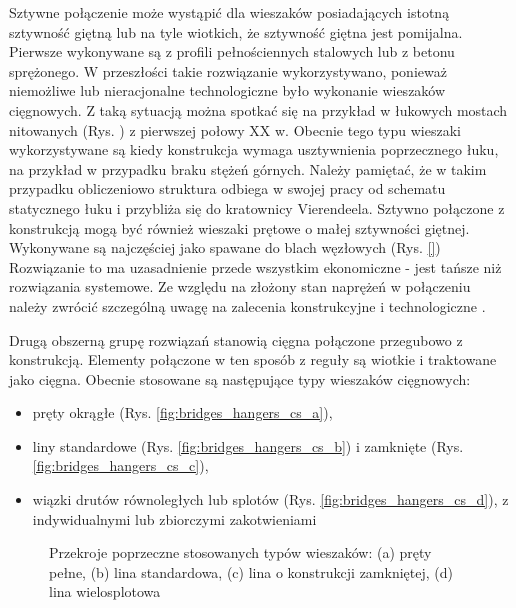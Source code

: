 Sztywne połączenie może wystąpić dla wieszaków posiadających istotną sztywność giętną lub na tyle wiotkich, że sztywność giętna jest pomijalna. Pierwsze wykonywane są z profili pełnościennych stalowych lub z betonu sprężonego. W przeszłości takie rozwiązanie wykorzystywano, ponieważ niemożliwe lub nieracjonalne technologiczne było wykonanie wieszaków cięgnowych. Z taką sytuacją można spotkać się na przykład w łukowych mostach nitowanych (Rys. ) z pierwszej połowy XX w. Obecnie tego typu wieszaki wykorzystywane są kiedy konstrukcja wymaga usztywnienia poprzecznego łuku, na przykład w przypadku braku stężeń górnych. Należy pamiętać, że w takim przypadku obliczeniowo struktura odbiega w swojej pracy od schematu statycznego łuku i przybliża się do kratownicy Vierendeela. Sztywno połączone z konstrukcją mogą być również wieszaki prętowe o małej sztywności giętnej. Wykonywane są najczęściej jako spawane do blach węzłowych (Rys. \ref{}) Rozwiązanie to ma uzasadnienie przede wszystkim ekonomiczne - jest tańsze niż rozwiązania systemowe. Ze względu na złożony stan naprężeń w połączeniu należy zwrócić szczególną uwagę na zalecenia konstrukcyjne i technologiczne \parencite{Gunther2000,BundesanstaltfurWasserbauHg.2018,Szafranski2017}. 

Drugą obszerną grupę rozwiązań stanowią cięgna połączone przegubowo z konstrukcją. Elementy połączone w ten sposób z reguły są wiotkie i traktowane jako cięgna. Obecnie stosowane są następujące typy wieszaków cięgnowych:
\begin{itemize}[noitemsep]
	\item pręty okrągłe (Rys. \ref{fig:bridges_hangers_cs_a}),
	\item liny standardowe (Rys. \ref{fig:bridges_hangers_cs_b}) i zamknięte (Rys. \ref{fig:bridges_hangers_cs_c}),
	\item wiązki drutów równoległych lub splotów (Rys. \ref{fig:bridges_hangers_cs_d}), z indywidualnymi lub zbiorczymi zakotwieniami
\end{itemize}

\begin{figure}[hbt!]
	\centering
	\captionsetup{justification=centering}
	 \quad
	 \quad
	 \quad
	\caption{Przekroje poprzeczne stosowanych typów wieszaków: (a) pręty pełne, (b) lina standardowa, (c) lina o konstrukcji zamkniętej, (d) lina wielosplotowa}
	\label{fig:bridges_hangers_cs}
\end{figure}


